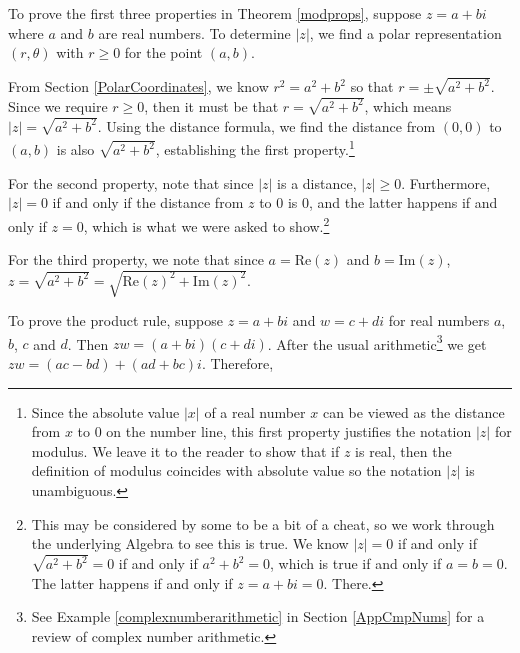 \documentclass{ximera}
\begin{document}
\smallskip

To prove the first three properties in Theorem \ref{modprops}, suppose $z = a + bi$ where $a$ and $b$ are real numbers.  To determine $|z|$, we find a polar representation $(r,\theta)$ with $r \geq 0$ for the point $(a,b)$.  

\smallskip

From Section \ref{PolarCoordinates}, we know $r^2 = a^2 + b^2$ so that $r = \pm \sqrt{a^2+b^2}$.  Since we require $r \geq 0$, then it must be that $r = \sqrt{a^2 +b^2}$, which means $|z| = \sqrt{a^2+b^2}$.  Using the distance formula, we find the distance from $(0,0)$ to $(a,b)$ is also $\sqrt{a^2+b^2}$, establishing the first property.\footnote{Since the absolute value $|x|$ of a real number $x$ can be viewed as the distance from $x$ to $0$ on the number line, this first property justifies the notation $|z|$ for modulus.  We leave it to the reader to show that if $z$ is real, then the definition of modulus coincides with absolute value so the notation $|z|$ is unambiguous.}  

\smallskip

For the second property, note that since $|z|$ is a distance, $|z| \geq 0$.  Furthermore,  $|z| = 0$ if and only if the distance from $z$ to $0$ is $0$, and the latter happens if and only if $z = 0$, which is what we were asked to show.\footnote{This may be considered by some to be a bit of a cheat, so we work through the underlying Algebra to see this is true.  We know  $|z| = 0$ if and only if $\sqrt{a^2+b^2} = 0$ if and only if $a^2+b^2 = 0$, which is true if and only if $a = b = 0$.  The latter happens if and only if $z = a + bi =0$.  There.}  

\smallskip

For the third property, we note that since $a = \text{Re}(z)$ and $b = \text{Im}(z)$, $z = \sqrt{a^2+b^2} = \sqrt{\text{Re}(z)^2 + \text{Im}(z)^2}$.

\smallskip

To prove the product rule, suppose $z = a + bi$ and  $w = c + di$ for real numbers $a$, $b$, $c$ and $d$.  Then $zw = (a+bi)(c+di)$.  After the usual arithmetic\footnote{See Example \ref{complexnumberarithmetic} in Section \ref{AppCmpNums} for a review of complex number arithmetic.} we get $zw = (ac-bd) + (ad+bc)i$. Therefore,
\end{document}
